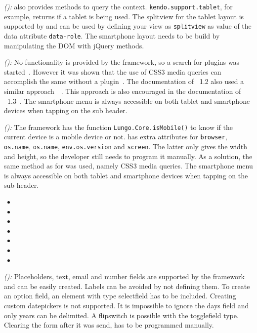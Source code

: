 \documentclass[a4paper]{artikel3}
\newcommand{\code}[1]{\texttt{#1}}
\newcommand{\setspace}[0]{\vspace{2mm}}
\renewcommand{\paragraph}[1]{\setspace \noindent {\bf #1}  }
\newcommand{\framework}[2]{ \emph{#1 (\textbf{#2}): }} %
\newcommand{\challenge}[1]{\paragraph{#1}}
\begin{document}
\framework{\kendoa}{}
\kendo{} also provides methods to query the context.
\code{kendo.support.tablet},  for example,  returns if a tablet is being used.
The splitview for the tablet layout is supported by \kendo{} and can be used by defining your view as \code{splitview} as value of the data attribute \code{data-role}.
The smartphone layout needs to be build by manipulating the DOM with jQuery methods.

\framework{\jqma}{}
No functionality is provided by the framework, so a search for plugins was started~\cite{Deering2012}.
However it was shown that the use of CSS3 media queries can accomplish the same without a plugin~\cite{Hadlock2012}.
The documentation of \jqma{}~1.2 also used a similar approach~~\cite{JQuery2012b}.
This approach is also encouraged in the documentation of \jqma{}~1.3~\cite{JQuery2013e}.
The smartphone menu is always accessible on both tablet and smartphone devices when tapping on the sub header.

\framework{\lungoa}{}
The framework has the function \code{Lungo.Core.isMobile()} to know if the current device is a mobile device or not.
\quo{} has extra attributes for \code{browser}, \code{os.name}, \code{os.name}, \code{env.os.version} and \code{screen}.
The latter only gives the width and height, so the developer still needs to program it manually.
As a solution, the same method as for \jqma{} was used, namely CSS3 media queries.
The smartphone menu is always accessible on both tablet and smartphone devices when tapping on the sub header.


\challenge{\chal{formulieren}}

\begin{itemize}
 \item {}
 \item {}
 \item {}
 \item {}
 \item {}
 \item {}
 \item {}
\end{itemize}

\framework{\sta}{}
Placeholders, text, email and number fields are supported by the framework and can be easily created.  
Labels can be avoided by not defining them.  
To create an option field, an element with type selectfield has to be included.
Creating custom datepickers is not supported.  
It is impossible to ignore the days field and only years can be delimited.  
A flipswitch is possible with the togglefield type.
Clearing the form after it was send, has to be programmed manually.
\end{document}
